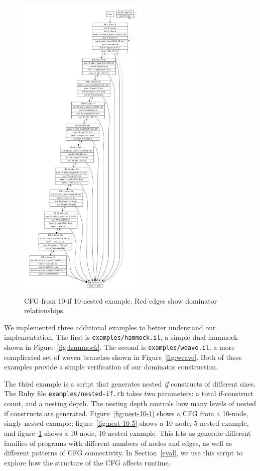 \documentclass[10pt,twocolumn]{article}
\begin{document}
\begin{figure}
\begin{center}
  \includegraphics[height=6in]{figs/nested-if-10-10.pdf}
  \caption{CFG from 10-if 10-nested example. Red edges show dominator relationships.}
  \label{fig:nest-10-10} 
\end{center}
\end{figure}

We implemented three additional examples to better understand our
implementation. The first is \texttt{examples/hammock.il}, a simple
dual hammock shown in Figure~\ref{fig:hammock}. The second is
\texttt{examples/weave.il}, a more complicated set of woven branches
shown in Figure~\ref{fig:weave}. Both of these examples provide a simple
verification of our dominator construction.

The third example is a script that generates nested {\it if}
constructs of different sizes. The Ruby file
\texttt{examples/nested-if.rb} takes two parameters: a total
if-construct count, and a nesting depth. The nesting depth controls
how many levels of nested if constructs are generated.
Figure~\ref{fig:nest-10-1} shows a CFG from a 10-node, singly-nested
example; figure~\ref{fig:nest-10-5} shows a 10-node, 5-nested example,
and figure~\ref{fig:nest-10-10} shows a 10-node, 10-nested
example. This lets us generate different families of programs with
different numbers of nodes and edges, as well as different patterns of
CFG connectivity. In Section~\ref{eval}, we use this script to explore
how the structure of the CFG affects runtime.
\end{document}
